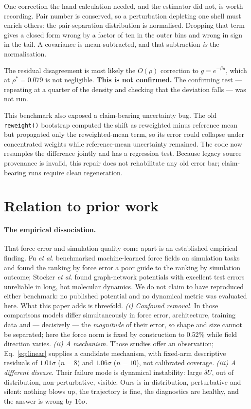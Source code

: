 \documentclass[aip,jcp,reprint,amsmath,amssymb,floatfix]{revtex4-2}
\newcommand{\dU}{\ensuremath{\delta U}}
\begin{document}
One correction the hand calculation needed, and the estimator did not, is worth
recording. Pair number is conserved, so a perturbation depleting one shell
must enrich others: the pair-separation distribution is normalised. Dropping
that term gives a closed form wrong by a factor of ten in the
outer bins and wrong in sign in the tail. A covariance is mean-subtracted, and
that subtraction \emph{is} the normalisation.

The residual disagreement is most likely the $O(\rho)$ correction to
$g = e^{-\beta u}$, which at $\rho^* = 0.079$ is not negligible. \textbf{This is
not confirmed.} The confirming test --- repeating at a quarter of the density
and checking that the deviation falls --- was not run.

This benchmark also exposed a claim-bearing uncertainty bug. The old
\texttt{reweight()} bootstrap computed the shift as reweighted minus reference
mean but propagated only the reweighted-mean term, so its error could collapse
under concentrated weights while reference-mean uncertainty remained. The code
now resamples the difference jointly and has a regression test. Because legacy
source provenance is invalid, this repair does not rehabilitate any old error
bar; claim-bearing runs require clean regeneration.

\section{Relation to prior work}
\label{sec:prior}

\paragraph*{The empirical dissociation.} That force error and simulation quality
come apart is an established empirical finding. Fu \emph{et al.}\cite{Fu2023}
benchmarked machine-learned force fields on simulation tasks and found the
ranking by force error a poor guide to the
ranking by simulation outcome; Stocker \emph{et al.}\cite{Stocker2022} found
graph-network potentials with excellent test errors unreliable in long,
hot molecular dynamics. We do not claim to have reproduced either
benchmark: no published potential and no dynamical metric was evaluated here.
What this paper adds is threefold. \emph{(i) Confound removal.} In those
comparisons models differ simultaneously in force error, architecture, training
data and --- decisively --- the \emph{magnitude} of their error, so shape and
size cannot be separated; here the force norm is fixed by construction to
0.52\% while field direction varies. \emph{(ii) A mechanism.} Those studies
offer an observation; Eq.~\eqref{eq:linear} supplies a candidate mechanism, with
fixed-arm descriptive residuals of $1.01\sigma$ ($n = 8$) and $1.06\sigma$
($n = 10$), not calibrated coverage. \emph{(iii) A
different disease.} Their failure mode is dynamical instability: large $\dU$,
out of distribution, non-perturbative, visible. Ours is in-distribution,
perturbative and silent: nothing blows up, the trajectory is fine, the
diagnostics are healthy, and the answer is wrong by $16\sigma$.
\end{document}
